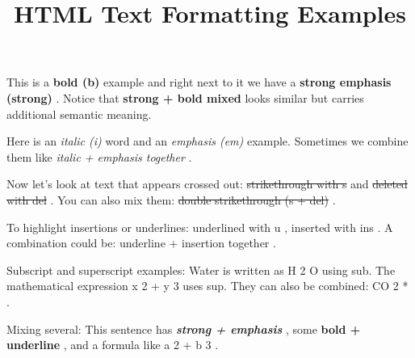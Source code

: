 \documentclass[11pt,a4paper]{article}
\title{HTML Text Formatting Examples}
\begin{document}
\maketitle

This is a \textbf{bold (b)} example and right next to it we have a \textbf{strong emphasis (strong)} . Notice that \textbf{strong + bold mixed} looks similar but carries additional semantic meaning.

Here is an \textit{italic (i)} word and an \textit{emphasis (em)} example. Sometimes we combine them like \textit{italic + emphasis together} .

Now let's look at text that appears crossed out: \sout{strikethrough with s} and \sout{deleted with del} . You can also mix them: \sout{double strikethrough (s + del)} .

To highlight insertions or underlines: underlined with u , inserted with ins . A combination could be: underline + insertion together .

Subscript and superscript examples: Water is written as H 2 O using sub. The mathematical expression x 2 + y 3 uses sup. They can also be combined: CO 2 * .

Mixing several: This sentence has \textit{\textbf{strong + emphasis}} , some \textbf{bold + underline} , and a formula like a 2 + b 3 .
\end{document}
